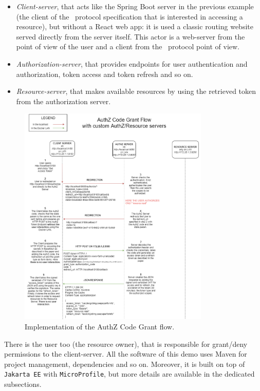 \begin{itemize}
    \item \textit{Client-server}, that acts like the Spring Boot server in the previous example (the client of the \oauth\ protocol specification that is interested in accessing a resource), but without a React web app: it is used a classic routing website served directly from the server itself. This actor is a web-server from the point of view of the user and a client from the \oauth\ protocol point of view.
    \item \textit{Authorization-server}, that provides endpoints for user authentication and authorization, token access and token refresh and so on.
    \item \textit{Resource-server}, that makes available resources by using the retrieved token from the authorization server.
\end{itemize}

\begin{figure}[h]
    \centering
    \includegraphics[width=0.81\textwidth]{chapters/images/chp6/flow_access1.png}
    \caption{Implementation of the AuthZ Code Grant flow.}
    \label{fig:access1}
\end{figure}

There is the user too (the resource owner), that is responsible for grant/deny permissions to the client-server. All the software of this demo uses Maven for project management, dependencies and so on. Moreover, it is built on top of \texttt{Jakarta EE} \cite{jaksec} with \texttt{MicroProfile}, but more details are available in the dedicated subsections.

